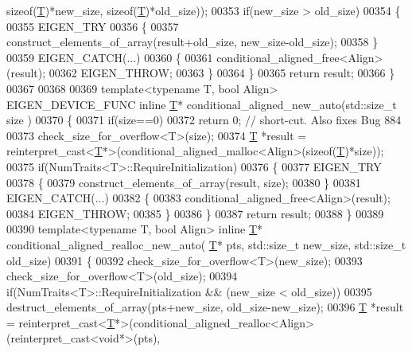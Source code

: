 \begin{DoxyCode}
{      sizeof}(\hyperlink{group___sparse_core___module_class_eigen_1_1_triplet}{T})*new\_size, \textcolor{keyword}{sizeof}(\hyperlink{group___sparse_core___module_class_eigen_1_1_triplet}{T})*old\_size));
00353   \textcolor{keywordflow}{if}(new\_size > old\_size)
00354   \{
00355     EIGEN\_TRY
00356     \{
00357       construct\_elements\_of\_array(result+old\_size, new\_size-old\_size);
00358     \}
00359     EIGEN\_CATCH(...)
00360     \{
00361       conditional\_aligned\_free<Align>(result);
00362       EIGEN\_THROW;
00363     \}
00364   \}
00365   \textcolor{keywordflow}{return} result;
00366 \}
00367 
00368 
00369 \textcolor{keyword}{template}<\textcolor{keyword}{typename} T, \textcolor{keywordtype}{bool} Align> EIGEN\_DEVICE\_FUNC \textcolor{keyword}{inline} \hyperlink{group___sparse_core___module_class_eigen_1_1_triplet}{T}* conditional\_aligned\_new\_auto(std::size\_t size
      )
00370 \{
00371   \textcolor{keywordflow}{if}(size==0)
00372     \textcolor{keywordflow}{return} 0; \textcolor{comment}{// short-cut. Also fixes Bug 884}
00373   check\_size\_for\_overflow<T>(size);
00374   \hyperlink{group___sparse_core___module_class_eigen_1_1_triplet}{T} *result = \textcolor{keyword}{reinterpret\_cast<}\hyperlink{group___sparse_core___module_class_eigen_1_1_triplet}{T}*\textcolor{keyword}{>}(conditional\_aligned\_malloc<Align>(\textcolor{keyword}{sizeof}(\hyperlink{group___sparse_core___module_class_eigen_1_1_triplet}{T})*size));
00375   \textcolor{keywordflow}{if}(NumTraits<T>::RequireInitialization)
00376   \{
00377     EIGEN\_TRY
00378     \{
00379       construct\_elements\_of\_array(result, size);
00380     \}
00381     EIGEN\_CATCH(...)
00382     \{
00383       conditional\_aligned\_free<Align>(result);
00384       EIGEN\_THROW;
00385     \}
00386   \}
00387   \textcolor{keywordflow}{return} result;
00388 \}
00389 
00390 \textcolor{keyword}{template}<\textcolor{keyword}{typename} T, \textcolor{keywordtype}{bool} Align> \textcolor{keyword}{inline} \hyperlink{group___sparse_core___module_class_eigen_1_1_triplet}{T}* conditional\_aligned\_realloc\_new\_auto(
      \hyperlink{group___sparse_core___module_class_eigen_1_1_triplet}{T}* pts, std::size\_t new\_size, std::size\_t old\_size)
00391 \{
00392   check\_size\_for\_overflow<T>(new\_size);
00393   check\_size\_for\_overflow<T>(old\_size);
00394   \textcolor{keywordflow}{if}(NumTraits<T>::RequireInitialization && (new\_size < old\_size))
00395     destruct\_elements\_of\_array(pts+new\_size, old\_size-new\_size);
00396   \hyperlink{group___sparse_core___module_class_eigen_1_1_triplet}{T} *result = \textcolor{keyword}{reinterpret\_cast<}\hyperlink{group___sparse_core___module_class_eigen_1_1_triplet}{T}*\textcolor{keyword}{>}(conditional\_aligned\_realloc<Align>(\textcolor{keyword}{reinterpret\_cast<}\textcolor{keywordtype}{void}*\textcolor{keyword}{>}(pts), \textcolor{keyword}{
}
\end{DoxyCode}
